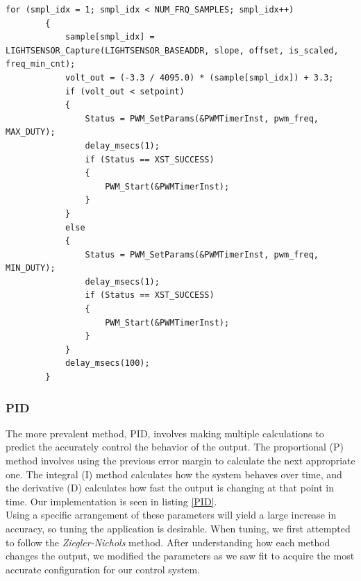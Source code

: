 \documentclass[11pt]{article}
\begin{document}
\vspace{12pt}

 \begin{lstlisting}[caption=Bang Bang Algorithm, label=bang]		
 	 for (smpl_idx = 1; smpl_idx < NUM_FRQ_SAMPLES; smpl_idx++)
 	    {
 	        sample[smpl_idx] = LIGHTSENSOR_Capture(LIGHTSENSOR_BASEADDR, slope, offset, is_scaled, freq_min_cnt);
 	        volt_out = (-3.3 / 4095.0) * (sample[smpl_idx]) + 3.3; 
 	        if (volt_out < setpoint)
 	        {
 	            Status = PWM_SetParams(&PWMTimerInst, pwm_freq, MAX_DUTY);
 	            delay_msecs(1);
 	            if (Status == XST_SUCCESS)
 	            {
 	                PWM_Start(&PWMTimerInst);
 	            }
 	        }
 	        else
 	        {
 	            Status = PWM_SetParams(&PWMTimerInst, pwm_freq, MIN_DUTY);
 	            delay_msecs(1);
 	            if (Status == XST_SUCCESS)
 	            {
 	                PWM_Start(&PWMTimerInst);
 	            }
 	        }
 	        delay_msecs(100);
 	    }
  \end{lstlisting}

\subsubsection{PID}
The more prevalent method, PID, involves making multiple calculations to predict the accurately control the behavior of the output.  The proportional (P) method involves using the previous error margin to calculate the next appropriate one.  The integral (I) method calculates how the system behaves over time, and the derivative (D) calculates how fast the output is changing at that point in time.  Our implementation is seen in listing \ref{PID}. \\
Using a specific arrangement of these parameters will yield a large increase in accuracy, so tuning the application is desirable.  When tuning, we first attempted to follow the \emph{Ziegler-Nichols} method.  After understanding how each method changes the output, we modified the parameters as we saw fit to acquire the most accurate configuration for our control system. 

\vspace{12pt}
\end{document}
